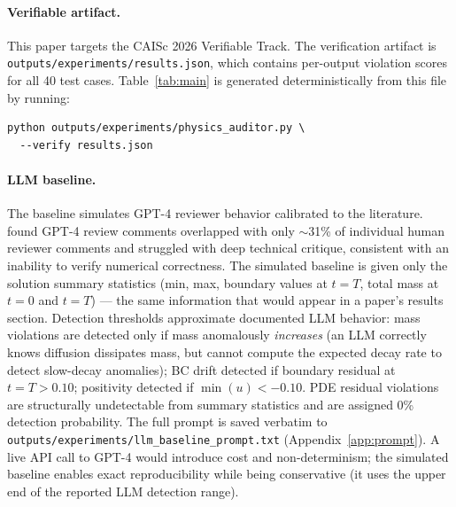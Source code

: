 \documentclass{article}
\begin{document}
\paragraph{Verifiable artifact.}
This paper targets the CAISc 2026 Verifiable Track.
The verification artifact is \texttt{outputs/experiments/results.json},
which contains per-output violation scores for all 40 test cases.
Table~\ref{tab:main} is generated deterministically from this file by running:
\begin{verbatim}
python outputs/experiments/physics_auditor.py \
  --verify results.json
\end{verbatim}

\paragraph{LLM baseline.}
The baseline simulates GPT-4 reviewer behavior calibrated to the literature.
\citet{Liang2024LLMReview} found GPT-4 review comments overlapped with only
$\sim$31\% of individual human reviewer comments and struggled with deep
technical critique, consistent with an inability to verify numerical correctness.
The simulated baseline is given only the solution summary statistics
(min, max, boundary values at $t=T$, total mass at $t=0$ and $t=T$) ---
the same information that would appear in a paper's results section.
Detection thresholds approximate documented LLM behavior: mass violations are
detected only if mass anomalously \emph{increases} (an LLM correctly knows
diffusion dissipates mass, but cannot compute the expected decay rate to detect
slow-decay anomalies); BC drift detected if boundary residual at $t=T > 0.10$;
positivity detected if $\min(u) < -0.10$.
PDE residual violations are structurally undetectable from summary statistics
and are assigned 0\% detection probability.
The full prompt is saved verbatim to
\texttt{outputs/experiments/llm\_baseline\_prompt.txt} (Appendix~\ref{app:prompt}).
A live API call to GPT-4 would introduce cost and non-determinism; the
simulated baseline enables exact reproducibility while being conservative
(it uses the upper end of the reported LLM detection range).
\end{document}

